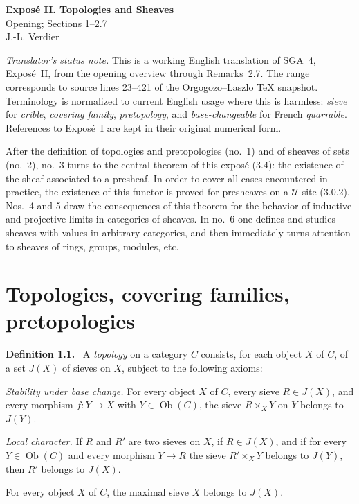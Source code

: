 \documentclass[11pt]{article}
\newcommand{\U}{\mathcal{U}}
\newcommand{\ob}{\operatorname{Ob}}
\newcommand{\etcn}{etc.}
\newenvironment{statement}[1]{\par\medskip\noindent\textbf{#1.}\ }{\par\medskip}
\begin{document}
\begin{center}
{\Large \textbf{Expos\'e II. Topologies and Sheaves}}\\[0.35em]
{\large Opening; Sections 1--2.7}\\[0.35em]
J.-L. Verdier
\end{center}

\bigskip

\noindent\emph{Translator's status note.} This is a working English translation of SGA~4, Expos\'e~II, from the opening overview through Remarks~2.7. The range corresponds to source lines 23--421 of the Orgogozo--Laszlo TeX snapshot. Terminology is normalized to current English usage where this is harmless: \emph{sieve} for \emph{crible}, \emph{covering family}, \emph{pretopology}, and \emph{base-changeable} for French \emph{quarrable}. References to Expos\'e~I are kept in their original numerical form.

\bigskip

After the definition of topologies and pretopologies (no.~1) and of sheaves of sets (no.~2), no.~3 turns to the central theorem of this expos\'e (3.4): the existence of the sheaf associated to a presheaf. In order to cover all cases encountered in practice, the existence of this functor is proved for presheaves on a \(\U\)-site (3.0.2). Nos.~4 and 5 draw the consequences of this theorem for the behavior of inductive and projective limits in categories of sheaves. In no.~6 one defines and studies sheaves with values in arbitrary categories, and then immediately turns attention to sheaves of rings, groups, modules, \etcn

\section{Topologies, covering families, pretopologies}

\begin{statement}{Definition 1.1}
A \emph{topology} on a category \(C\) consists, for each object \(X\) of \(C\), of a set \(J(X)\) of sieves on \(X\), subject to the following axioms:
\begin{description}[leftmargin=2.8em,style=nextline]
\item[T 1)] \emph{Stability under base change.} For every object \(X\) of \(C\), every sieve \(R\in J(X)\), and every morphism \(f:Y\to X\) with \(Y\in\ob(C)\), the sieve \(R\times_XY\) on \(Y\) belongs to \(J(Y)\).

\item[T 2)] \emph{Local character.} If \(R\) and \(R'\) are two sieves on \(X\), if \(R\in J(X)\), and if for every \(Y\in\ob(C)\) and every morphism \(Y\to R\) the sieve \(R'\times_XY\) belongs to \(J(Y)\), then \(R'\) belongs to \(J(X)\).

\item[T 3)] For every object \(X\) of \(C\), the maximal sieve \(X\) belongs to \(J(X)\).
\end{description}
\end{statement}
\end{document}
